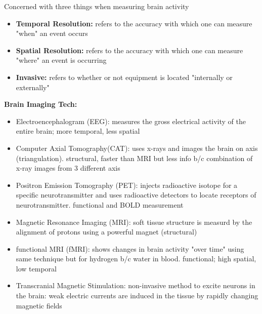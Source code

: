 \documentclass{article}
\begin{document}
\noindent Concerned with three things when measuring brain activity 
\begin{itemize}
    \item \textbf{Temporal Resolution:} refers to the accuracy with which one can measure "when" an event occurs
    \item \textbf{Spatial Resolution:} refers to the accuracy with which one can measure "where" an event is occurring
    \item \textbf{Invasive:} refers to whether or not equipment is located "internally or externally" 
\end{itemize}

\noindent\textbf{Brain Imaging Tech:}
\begin{itemize}
    \item Electroencephalogram (EEG): measures the gross electrical activity of the entire brain; more temporal, less spatial
    \item Computer Axial Tomography(CAT): uses x-rays and images the brain on axis (triangulation). structural, faster than MRI but less info b/c combination of x-ray images from 3 different axis
    \item Positron Emission Tomography (PET): injects radioactive isotope for a specific neurotransmitter and uses radioactive detectors to locate receptors of neurotransmitter. functional and BOLD measurement
    \item Magnetic Resonance Imaging (MRI): soft tissue structure is measurd by the alignment of protons using a powerful magnet (structural) 
    \item functional MRI (fMRI): shows changes in brain activity "over time" using same technique but for hydrogen b/c water in blood. functional; high spatial, low temporal 
    \item Transcranial Magnetic Stimulation: non-invasive method to excite neurons in the brain: weak electric currents are induced in the tissue by rapidly changing magnetic fields
\end{itemize}
\end{document}
